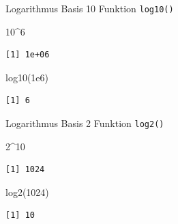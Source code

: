 \documentclass[
  10pt,
  ignorenonframetext,
  aspectratio=169,
]{beamer}
\newenvironment{Shaded}{}{}
\newcommand{\DecValTok}[1]{\textcolor[rgb]{0.25,0.63,0.44}{#1}}
\newcommand{\FloatTok}[1]{\textcolor[rgb]{0.25,0.63,0.44}{#1}}
\newcommand{\FunctionTok}[1]{\textcolor[rgb]{0.02,0.16,0.49}{#1}}
\newcommand{\NormalTok}[1]{#1}
\newcommand{\SpecialCharTok}[1]{\textcolor[rgb]{0.25,0.44,0.63}{#1}}
\begin{document}
\begin{frame}[fragile]{Logarithmus Basis 10}
\label{logarithmus-basis-10}
Funktion \texttt{log10()}

\begin{Shaded}
\begin{Highlighting}[]
\DecValTok{10}\SpecialCharTok{\^{}}\DecValTok{6}
\end{Highlighting}
\end{Shaded}

\begin{verbatim}
[1] 1e+06
\end{verbatim}

\begin{Shaded}
\begin{Highlighting}[]
\FunctionTok{log10}\NormalTok{(}\FloatTok{1e6}\NormalTok{)}
\end{Highlighting}
\end{Shaded}

\begin{verbatim}
[1] 6
\end{verbatim}
\end{frame}

\begin{frame}[fragile]{Logarithmus Basis 2}
\label{logarithmus-basis-2}
Funktion \texttt{log2()}

\begin{Shaded}
\begin{Highlighting}[]
\DecValTok{2}\SpecialCharTok{\^{}}\DecValTok{10}
\end{Highlighting}
\end{Shaded}

\begin{verbatim}
[1] 1024
\end{verbatim}

\begin{Shaded}
\begin{Highlighting}[]
\FunctionTok{log2}\NormalTok{(}\DecValTok{1024}\NormalTok{)}
\end{Highlighting}
\end{Shaded}

\begin{verbatim}
[1] 10
\end{verbatim}
\end{frame}
\end{document}
